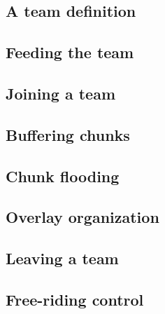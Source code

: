 

\subsection{A team definition}


\subsection{Feeding the team}


\subsection{Joining a team}


\subsection{Buffering chunks}


\subsection{Chunk flooding}


\subsection{Overlay organization}


\subsection{Leaving a team}


\subsection{Free-riding control}


%

%

